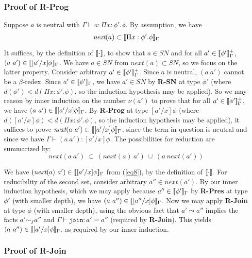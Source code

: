 \documentclass[copyright]{eptcs}
\newcommand{\next}[0]{\textit{next}}
\newcommand{\SN}[0]{\textit{SN}}
\newcommand{\join}[0]{\texttt{join}}
\newcommand{\interp}[1]{[\negthinspace[#1]\negthinspace]}
\begin{document}
\subsubsection{Proof of \textbf{R-Prog}}

Suppose $a$ is neutral with $\Gamma\vdash a:\Pi x:\phi'.\phi$.  By
assumption, we have
\begin{equation}
\next(a) \subset \interp{\Pi x:\phi'.\phi}_\Gamma \label{eq8}
\end{equation}

\noindent It suffices, by the definition of $\interp{\cdot}$, to show
that $a\in\SN$ and for all $a'\in\interp{\phi'}^+_\Gamma$,
$(a\ a')\in\interp{[a'/x]\phi}_\Gamma$. We have $a\in\SN$ from
$\next(a)\subset\SN$, so we focus on the latter property.  Consider
arbitrary $a'\in\interp{\phi'}^+_\Gamma$.  Since $a$ is neutral,
$(a\ a')$ cannot be a $\beta$-redex.  Since
$a'\in\interp{\phi'}_\Gamma$, we have $a'\in\SN$ by \textbf{R-SN} at
type $\phi'$ (where $d(\phi') < d(\Pi x:\phi'.\phi)$, so the induction
hypothesis may be applied).  So we may reason by inner induction on
the number $\nu(a')$ to prove that for all
$a'\in\interp{\phi'}^+_\Gamma$, we have
$(a\ a')\in\interp{[a'/x]\phi}_\Gamma$.  By \textbf{R-Prog} at type
$[a'/x]\phi$ (where $d([a'/x]\phi)<d(\Pi x:\phi'.\phi)$, so the
induction hypothesis may be applied), it suffices to prove
$\next(a\ a')\subset\interp{[a'/x]\phi}_\Gamma$, since the term in
question is neutral and since we have $\Gamma \vdash
(a\ a'):[a'/x]\phi$.  The possibilities for reduction are summarized
by:
\begin{equation*}
\next(a\ a')\ \subset\ (\next(a)\ a')\ \cup\ (a\ \next(a'))
\end{equation*}

\noindent We have $(\next(a)\ a')\in\interp{[a'/x]\phi}_\Gamma$ from
(\ref{eq8}), by the definition of $\interp{\cdot}$.  For reducibility
of the second set, consider arbitrary $a''\in\next(a')$.  By our inner
induction hypothesis, which we may apply because
$a''\in\interp{\phi'}_\Gamma$ by \textbf{R-Pres} at type $\phi'$ (with
smaller depth), we have $(a\ a'')\in\interp{[a''/x]\phi}_\Gamma$.  Now
we may apply \textbf{R-Join} at type $\phi$ (with smaller depth),
using the obvious fact that $a' \leadsto a''$ implies the facts $a'
\sim_\Gamma a''$ and $\Gamma\vdash \join:a' = a''$ (required by
\textbf{R-Join}).  This yields
$(a\ a'')\in\interp{[a'/x]\phi}_\Gamma$, as required by our inner
induction.

\subsubsection{Proof of \textbf{R-Join}}
\end{document}
